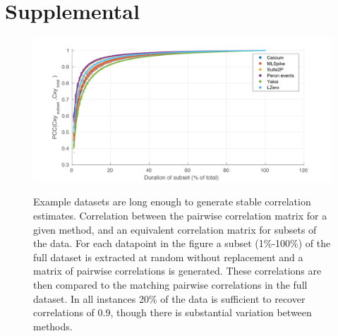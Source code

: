 \documentclass[a4paper,10pt,twocolumn]{article}
\newcommand{\beginsupplement}{%
        \setcounter{table}{0}
        \renewcommand{\thetable}{S\arabic{table}}%
        \setcounter{figure}{0}
        \renewcommand{\thefigure}{S\arabic{figure}}%
     }
\begin{document}
\clearpage
\beginsupplement
\section{Supplemental}

\begin{figure}[h!]
{\includegraphics[trim={30 20 60 20},clip,width=\textwidth]{figs/cxy_subset_comparison3.png}}
{\caption{\label{fig:supp_cxy_stability}Example datasets are long enough to generate stable correlation estimates. Correlation between the pairwise correlation matrix for a given method, and an equivalent correlation matrix for subsets of the data. For each datapoint in the figure a subset (1\%-100\%) of the full dataset is extracted at random without replacement and a matrix of pairwise correlations is generated. These correlations are then compared to the matching pairwise correlations in the full dataset. In all instances 20\% of the data is sufficient to recover correlations of 0.9, though there is substantial variation between methods.}}%
\end{figure} %



\end{document}
